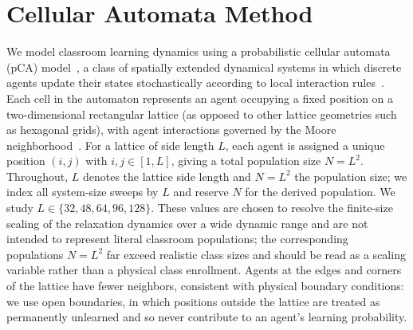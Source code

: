 \documentclass[a4paper,fleqn]{cas-sc}
\begin{document}
\section{Cellular Automata Method}\label{sec:methods}

We model classroom learning dynamics using a probabilistic cellular automata (pCA) model~\citep{SelfSPP}, a class of spatially extended dynamical systems in which discrete agents update their states stochastically according to local interaction rules~\citep{louis2018probabilistic, Fernandez2018, cirillo2024block}.
Each cell in the automaton represents an agent occupying a fixed position on a two-dimensional rectangular lattice (as opposed to other lattice geometries such as hexagonal grids), with agent interactions governed by the Moore neighborhood~\citep{kari2005catheory, zaitsev2017generalized}.
For a lattice of side length $L$, each agent is assigned a unique position $(i,j)$ with $i,j\in[1,L]$, giving a total population size $N=L^2$.
Throughout, $L$ denotes the lattice side length and $N=L^2$ the population size; we index all system-size sweeps by $L$ and reserve $N$ for the derived population. We study $L\in\{32,48,64,96,128\}$. These values are chosen to resolve the finite-size scaling of the relaxation dynamics over a wide dynamic range and are not intended to represent literal classroom populations; the corresponding populations $N=L^2$ far exceed realistic class sizes and should be read as a scaling variable rather than a physical class enrollment.
Agents at the edges and corners of the lattice have fewer neighbors, consistent with physical boundary conditions: we use open boundaries, in which positions outside the lattice are treated as permanently unlearned and so never contribute to an agent's learning probability.
\end{document}
